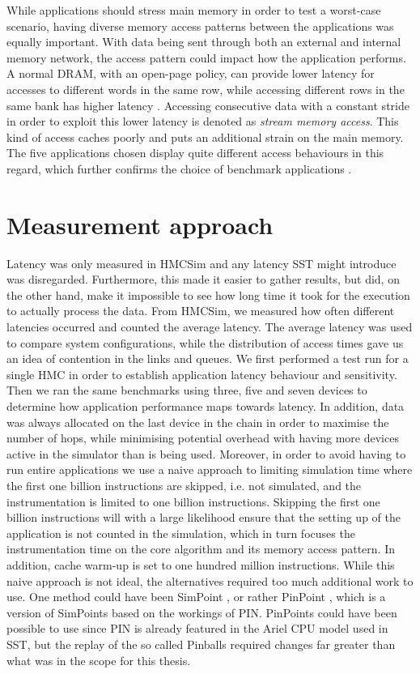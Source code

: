 While applications should stress main memory in order to test a worst-case scenario, having diverse memory access patterns between the applications was equally important. With data being sent through both an external and internal memory network, the access pattern could impact how the application performs. A normal DRAM, with an open-page policy, can provide lower latency for accesses to different words in the same row, while accessing different rows in the same bank has higher latency \cite{10.1145/342001.339668}. Accessing consecutive data with a constant stride in order to exploit this lower latency is denoted as \emph{stream memory access}. This kind of access caches poorly and puts an additional strain on the main memory. The five applications chosen display quite different access behaviours in this regard, which further confirms the choice of benchmark applications \cite{10.1145/3307650.3322229, song2018experiments}.


\section{Measurement approach}
Latency was only measured in HMCSim and any latency SST might introduce was disregarded. Furthermore, this made it easier to gather results, but did, on the other hand, make it impossible to see how long time it took for the execution to actually process the data. From HMCSim, we measured how often different latencies occurred and counted the average latency. The average latency was used to compare system configurations, while the distribution of access times gave us an idea of contention in the links and queues. We first performed a test run for a single HMC in order to establish application latency behaviour and sensitivity. Then we ran the same benchmarks using three, five and seven devices to determine how application performance maps towards latency. In addition, data was always allocated on the last device in the chain in order to maximise the number of hops, while minimising potential overhead with having more devices active in the simulator than is being used. Moreover, in order to avoid having to run entire applications we use a naive approach to limiting simulation time where the first one billion instructions are skipped, i.e. not simulated, and the instrumentation is limited to one billion instructions. Skipping the first one billion instructions will with a large likelihood ensure that the setting up of the application is not counted in the simulation, which in turn focuses the instrumentation time on the core algorithm and its memory access pattern. In addition, cache warm-up is set to one hundred million instructions. While this naive approach is not ideal, the alternatives required too much additional work to use. One method could have been SimPoint \cite{hamerly2005simpoint}, or rather PinPoint \cite{pinplay2010patil}, which is a version of SimPoints based on the workings of PIN. PinPoints could have been possible to use since PIN is already featured in the Ariel CPU model used in SST, but the replay of the so called Pinballs required changes far greater than what was in the scope for this thesis.
\bigskip

